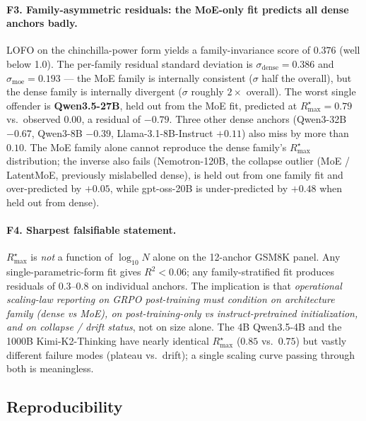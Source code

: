 \paragraph{F3. Family-asymmetric residuals: the MoE-only fit predicts all dense anchors badly.}
LOFO on the chinchilla-power form yields a family-invariance score of
$0.376$ (well below 1.0).  The per-family residual standard deviation
is $\sigma_\mathrm{dense} = 0.386$ and $\sigma_\mathrm{moe} = 0.193$
--- the MoE family is internally consistent ($\sigma$ half the
overall), but the dense family is internally divergent ($\sigma$
roughly $2\times$ overall).  The worst single offender is
\textbf{Qwen3.5-27B}, held out from the MoE fit, predicted at
$R_\mathrm{max}^\star = 0.79$ vs.\ observed $0.00$, a residual of
$-0.79$.  Three other dense anchors (Qwen3-32B $-0.67$, Qwen3-8B
$-0.39$, Llama-3.1-8B-Instruct $+0.11$) also miss by more than
$0.10$.  The MoE family alone cannot reproduce the dense family's
$R_\mathrm{max}^\star$ distribution; the inverse also fails
(Nemotron-120B, the collapse outlier (MoE / LatentMoE, previously mislabelled dense), is held out from one family fit and
over-predicted by $+0.05$, while gpt-oss-20B is under-predicted by
$+0.48$ when held out from dense).

\paragraph{F4. Sharpest falsifiable statement.}
$R_\mathrm{max}^\star$ is \emph{not} a function of $\log_{10} N$
alone on the 12-anchor GSM8K panel.  Any single-parametric-form fit
gives $R^2 < 0.06$; any family-stratified fit produces residuals of
$0.3$--$0.8$ on individual anchors.  The implication is that
\emph{operational scaling-law reporting on GRPO post-training must
condition on architecture family (dense vs MoE), on
post-training-only vs instruct-pretrained initialization, and on
collapse / drift status}, not on size alone.  The 4B Qwen3.5-4B and
the 1000B Kimi-K2-Thinking have nearly identical $R_\mathrm{max}^\star$
($0.85$ vs.\ $0.75$) but vastly different failure modes (plateau vs.\
drift); a single scaling curve passing through both is meaningless.

\subsection*{Reproducibility}


